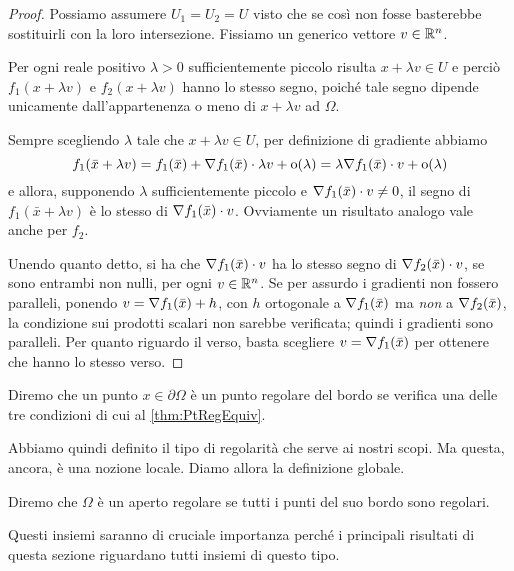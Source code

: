 \begin{proof}
	Possiamo assumere $U_1=U_2=U$ visto che se così non fosse basterebbe sostituirli con la loro intersezione. Fissiamo un generico vettore $v\in\mathbb R^n$.
	
	Per ogni reale positivo $\lambda>0$ sufficientemente piccolo risulta $x+\lambda v\in U$ e perciò $f_1(x+\lambda v)$ e $f_2(x+\lambda v)$ hanno lo stesso segno, poiché tale segno dipende unicamente dall'appartenenza o meno di $x+\lambda v$ ad $\Omega$. 
	
	Sempre scegliendo $\lambda$ tale che $x+\lambda v\in U$, per definizione di gradiente abbiamo
	\begin{equation*}
		f_1(\bar x+\lambda v)=f_1(\bar x)+\nabla f_1(\bar x)\cdot \lambda v+\mathrm{o}(\lambda)=\lambda \nabla f_1(\bar x)\cdot v+\mathrm{o}(\lambda)
	\end{equation*}
	e allora, supponendo $\lambda$ sufficientemente piccolo e $\nabla f_1(\bar x)\cdot v\not =0$, il segno di $f_1(\bar x+\lambda v)$ è lo stesso di $\nabla f_1(\bar x)\cdot v$.
	Ovviamente un risultato analogo vale anche per $f_2$.
	
	Unendo quanto detto, si ha che $\nabla f_1(\bar x)\cdot v$ ha lo stesso segno di $\nabla f_2(\bar x)\cdot v$, se sono entrambi non nulli, per ogni $v\in\mathbb R^n$. 
	Se per assurdo i gradienti non fossero paralleli, ponendo $v=\nabla f_1(\bar x)+h$, con $h$ ortogonale a $\nabla f_1(\bar x)$ ma \emph{non} a $\nabla f_2(\bar x)$, la condizione sui prodotti scalari non sarebbe verificata; quindi i gradienti sono paralleli. Per quanto riguardo il verso, basta scegliere $v=\nabla f_1(\bar x)$ per ottenere che hanno lo stesso verso.
\end{proof}


\begin{definition}
	Diremo che un punto $x\in \partial \Omega$ è un punto regolare del bordo se verifica una delle tre condizioni di cui
	al \cref{thm:PtRegEquiv}.
\end{definition}

Abbiamo quindi definito il tipo di regolarità che serve ai nostri scopi. Ma questa, ancora, è una nozione locale. Diamo allora la definizione globale.

\begin{definition}
	Diremo che $\Omega$ è un aperto regolare se tutti i punti del suo bordo sono regolari.
\end{definition}

Questi insiemi saranno di cruciale importanza perché i principali risultati di questa sezione riguardano tutti insiemi di questo tipo.


